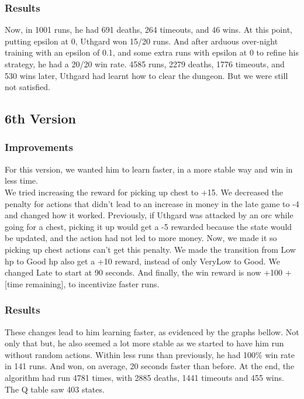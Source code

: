 \documentclass{article}
\begin{document}
  \subsubsection{Results}

  Now, in 1001 runs, he had 691 deaths, 264 timeouts, and 46 wins. At this point, putting epsilon at 0, Uthgard won 15/20 runs. And after arduous over-night training with an epsilon of 0.1, and some extra runs with epsilon at 0 to refine his strategy, he had a 20/20 win rate. 
  4585 runs, 2279 deaths, 1776 timeouts, and 530 wins later, Uthgard had learnt how to clear the dungeon. But we were still not satisfied.

  \subsection{6th Version}

  \subsubsection{Improvements}

  For this version, we wanted him to learn faster, in a more stable way and win in less time.\\
  We tried increasing the reward for picking up chest to +15. We decreased the penalty for actions that didn't lead to an increase in money in the late game to -4 and changed how it worked. Previously, if Uthgard was attacked by an orc while going for a chest, picking it up would get a -5 rewarded because the state would be updated, and the action had not led to more money. 
  Now, we made it so picking up chest actions can't get this penalty. We made the transition from Low hp to Good hp also get a +10 reward, instead of only VeryLow to Good. We changed Late to start at 90 seconds. And finally, the win reward is now +100 + [time remaining], to incentivize faster runs.

  \subsubsection{Results}

  These changes lead to him learning faster, as evidenced by the graphs bellow.
  Not only that but, he also seemed a lot more stable as we started to have him run without random actions. Within less runs than previously, he had 100\% win rate in 141 runs. And won, on average, 20 seconds faster than before. At the end, the algorithm had run 4781 times, with 2885 deaths, 1441 timeouts and 455 wins. The Q table saw 403 states.
\end{document}
